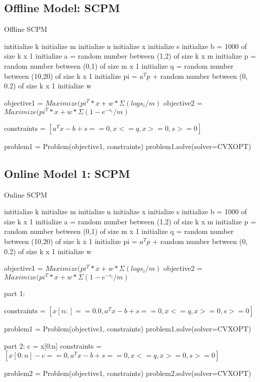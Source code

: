 \documentclass[12pt]{article}
\begin{document}
\subsection*{Offline Model: SCPM}
\begin{algorithm}
\caption{Offline SCPM}
\begin{algorithmic}
\STATE intitialize k
\STATE initialize m
\STATE initialize n
\STATE initialize x
\STATE initialize s
\STATE initialize b = 1000 of size k x 1
\STATE initialize a = random number between (1,2) of size k x m 
\STATE initialize p = random number between (0,1) of size m x 1
\STATE initialize q = random number between (10,20) of size k x 1
\STATE initialize pi = $a^{T}p$ + random number between (0, 0.2) of size k x 1
\STATE initialize w

\STATE objective1 = $Maximize(pi^{T}*x + w*\Sigma(logs_i/m)$
\STATE objective2 = $Maximize(pi^{T}*x + w*\Sigma(1-e^{-s_i}/m)$

\STATE constraints = $[a^{T}x  - b + s == 0, x <= q, x >= 0, s >= 0]$

\STATE problem1 = Problem(objective1, constraints)
\STATE problem1.solve(solver=CVXOPT) 

\end{algorithmic}
\end{algorithm}
\pagebreak
\subsection*{Online Model 1: SCPM}
\begin{algorithm}
\caption{Online SCPM}
\begin{algorithmic}
\STATE intitialize k
\STATE initialize m
\STATE initialize n
\STATE initialize x
\STATE initialize s
\STATE initialize b = 1000 of size k x 1
\STATE initialize a = random number between (1,2) of size k x m 
\STATE initialize p = random number between (0,1) of size m x 1
\STATE initialize q = random number between (10,20) of size k x 1
\STATE initialize pi = $a^{T}p$ + random number between (0, 0.2) of size k x 1
\STATE initialize w

\STATE objective1 = $Maximize(pi^{T}*x + w*\Sigma(logs_i/m)$
\STATE objective2 = $Maximize(pi^{T}*x + w*\Sigma(1-e^{-s_i}/m)$

\STATE part 1:

\STATE constraints = $[x[n:] == 0.0,a^{T}x  - b + s == 0, x <= q, x >= 0, s >= 0]$

\STATE problem1 = Problem(objective1, constraints)
\STATE problem1.solve(solver=CVXOPT) 

\STATE part 2:
\STATE c = x[0:n]
\STATE constraints = $[x[0:n] - c == 0,a^{T}x  - b + s == 0, x <= q, x >= 0, s >= 0]$

\STATE problem2 = Problem(objective1, constraints)
\STATE problem2.solve(solver=CVXOPT) 
\end{algorithmic}
\end{algorithm}
\pagebreak
\end{document}
